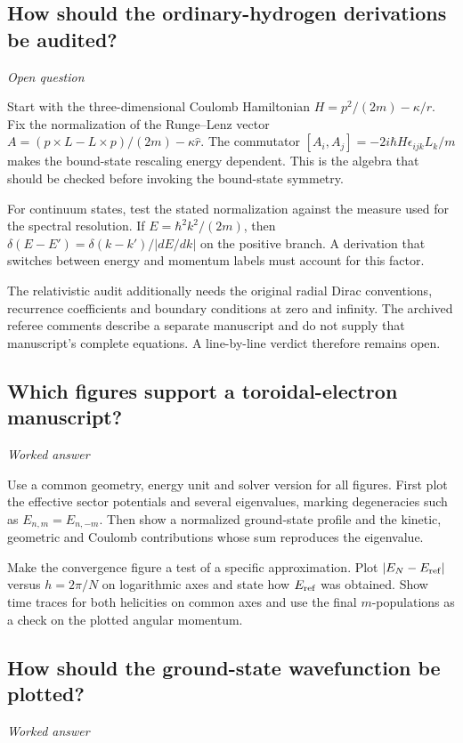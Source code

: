 \documentclass[11pt]{article}
\begin{document}
\subsection{How should the ordinary-hydrogen derivations be audited?}
\label{problem:torus-hydrogen-review}
\textit{Open question}

Start with the three-dimensional Coulomb Hamiltonian \(H=p^2/(2m)-\kappa/r\). Fix the normalization of the Runge--Lenz vector \(A=(p\times L-L\times p)/(2m)-\kappa\hat r\). The commutator \([A_i,A_j]=-2i\hbar H\epsilon_{ijk}L_k/m\) makes the bound-state rescaling energy dependent. This is the algebra that should be checked before invoking the bound-state symmetry.

For continuum states, test the stated normalization against the measure used for the spectral resolution. If \(E=\hbar^2k^2/(2m)\), then \(\delta(E-E')=\delta(k-k')/|dE/dk|\) on the positive branch. A derivation that switches between energy and momentum labels must account for this factor.

The relativistic audit additionally needs the original radial Dirac conventions, recurrence coefficients and boundary conditions at zero and infinity. The archived referee comments describe a separate manuscript and do not supply that manuscript's complete equations. A line-by-line verdict therefore remains open.

\subsection{Which figures support a toroidal-electron manuscript?}
\label{problem:torus-figures}
\textit{Worked answer}

Use a common geometry, energy unit and solver version for all figures. First plot the effective sector potentials and several eigenvalues, marking degeneracies such as \(E_{n,m}=E_{n,-m}\). Then show a normalized ground-state profile and the kinetic, geometric and Coulomb contributions whose sum reproduces the eigenvalue.

Make the convergence figure a test of a specific approximation. Plot \(|E_N-E_{\rm ref}|\) versus \(h=2\pi/N\) on logarithmic axes and state how \(E_{\rm ref}\) was obtained. Show time traces for both helicities on common axes and use the final \(m\)-populations as a check on the plotted angular momentum.

\subsection{How should the ground-state wavefunction be plotted?}
\label{problem:torus-wavefunction}
\textit{Worked answer}
\end{document}
